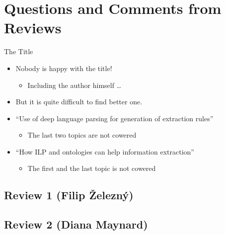 \documentclass[xcolor=dvipsnames]{beamer}
\begin{document}
\resetcolor
\section[Questions \& Comments]{Questions and Comments from Reviews} 
\frame{\tableofcontents[currentsection]}


\begin{frame}{The Title}
\begin{itemize}
	\item Nobody is happy with the title!
	\begin{itemize}
		\item Including the author himself \dots
	\end{itemize}
	\bigskip
	\item But it is quite difficult to find better one.
	\bigskip
	\item ``Use of deep language parsing for generation of extraction rules''
	\begin{itemize}
		\item The last two topics are not cowered
	\end{itemize}
	\item ``How ILP and ontologies can help information extraction''
	\begin{itemize}
		\item The first and the last topic is not cowered
	\end{itemize}
\end{itemize}
\end{frame}



\subsection{Review 1 (Filip Železný)} 

\subsection{Review 2 (Diana Maynard)} 
\end{document}
